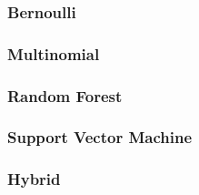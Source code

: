 \subsubsection{Bernoulli} %
\label{ssub:bernoulli}

\subsubsection{Multinomial} %
\label{ssub:multinomial}

\subsubsection{Random Forest} %
\label{ssub:random_forest}

\subsubsection{Support Vector Machine} %
\label{ssub:support_vector_machine}

\subsubsection{Hybrid} %
\label{ssub:hybrid}

